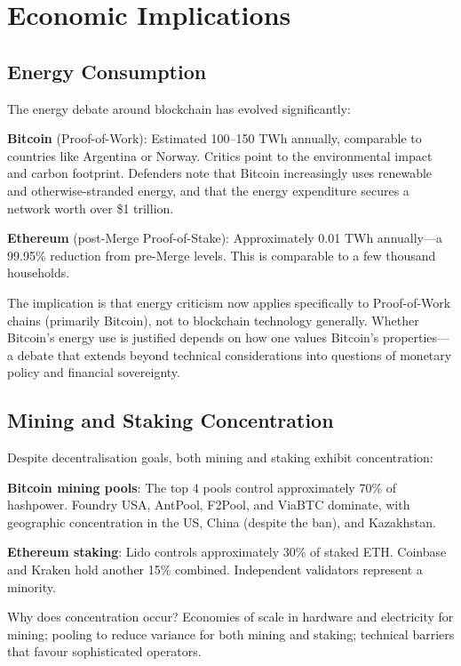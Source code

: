 \documentclass[11pt,a4paper]{article}
\begin{document}
\section{Economic Implications}

\subsection{Energy Consumption}

The energy debate around blockchain has evolved significantly:

\textbf{Bitcoin} (Proof-of-Work): Estimated 100--150 TWh annually, comparable to countries like Argentina or Norway. Critics point to the environmental impact and carbon footprint. Defenders note that Bitcoin increasingly uses renewable and otherwise-stranded energy, and that the energy expenditure secures a network worth over \$1 trillion.

\textbf{Ethereum} (post-Merge Proof-of-Stake): Approximately 0.01 TWh annually---a 99.95\% reduction from pre-Merge levels. This is comparable to a few thousand households.

The implication is that energy criticism now applies specifically to Proof-of-Work chains (primarily Bitcoin), not to blockchain technology generally. Whether Bitcoin's energy use is justified depends on how one values Bitcoin's properties---a debate that extends beyond technical considerations into questions of monetary policy and financial sovereignty.

\subsection{Mining and Staking Concentration}

Despite decentralisation goals, both mining and staking exhibit concentration:

\textbf{Bitcoin mining pools}: The top 4 pools control approximately 70\% of hashpower. Foundry USA, AntPool, F2Pool, and ViaBTC dominate, with geographic concentration in the US, China (despite the ban), and Kazakhstan.

\textbf{Ethereum staking}: Lido controls approximately 30\% of staked ETH. Coinbase and Kraken hold another 15\% combined. Independent validators represent a minority.

Why does concentration occur? Economies of scale in hardware and electricity for mining; pooling to reduce variance for both mining and staking; technical barriers that favour sophisticated operators.
\end{document}
